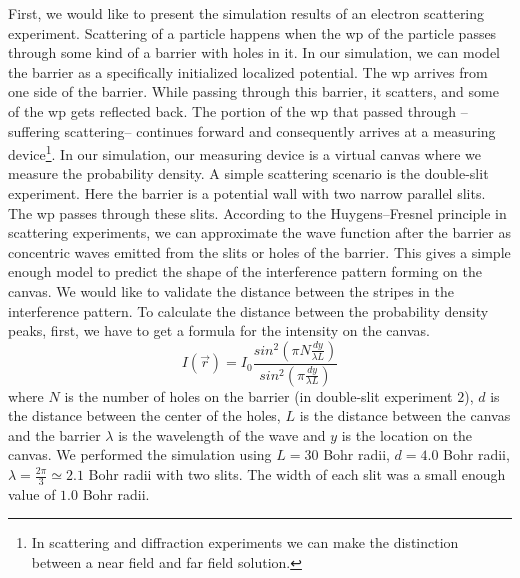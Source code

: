 First, we would like to present the simulation results of an electron scattering experiment.
Scattering of a particle happens when the \acrshort{wp} of the particle passes through some kind of a barrier with holes in it.
In our simulation, we can model the barrier as a specifically initialized localized potential.
The \acrshort{wp} arrives from one side of the barrier.
While passing through this barrier, it scatters, and some of the \acrshort{wp} gets reflected back.
The portion of the \acrshort{wp} that passed through --suffering scattering-- continues forward and consequently arrives at a measuring device\footnote{In scattering and diffraction experiments we can make the distinction between a near field and far field solution.}.
In our simulation, our measuring device is a virtual canvas where we measure the probability density.
A simple scattering scenario is the double-slit experiment.
Here the barrier is a potential wall with two narrow parallel slits.
The \acrshort{wp} passes through these slits.
According to the Huygens–Fresnel principle in scattering experiments, we can approximate the wave function after the barrier as concentric waves emitted from the slits or holes of the barrier.
This gives a simple enough model to predict the shape of the interference pattern forming on the canvas.
We would like to validate the distance between the stripes in the interference pattern.
To calculate the distance between the probability density peaks, first, we have to get a formula for the intensity on the canvas.
\begin{equation}
	\label{eq:Huygens}
	I(\vec{r}) = I_0 \frac{sin^2\left( \pi N \frac{dy}{\lambda L} \right)}{sin^2\left( \pi \frac{dy}{\lambda L} \right)}
\end{equation}
where $N$ is the number of holes on the barrier (in double-slit experiment $2$), $d$ is the distance between the center of the holes, $L$ is the distance between the canvas and the barrier $\lambda$ is the wavelength of the wave and $y$ is the location on the canvas.
We performed the simulation using $L = 30$ Bohr radii, $d = 4.0$ Bohr radii, $\lambda = \frac{2\pi}{3}\simeq 2.1$ Bohr radii with two slits.
The width of each slit was a small enough value of $1.0$ Bohr radii.
